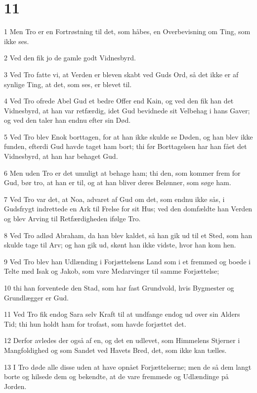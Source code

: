 \chapter{11}

\par 1 Men Tro er en Fortrøstning til det, som håbes, en Overbevisning om Ting, som ikke ses.
\par 2 Ved den fik jo de gamle godt Vidnesbyrd.
\par 3 Ved Tro fatte vi, at Verden er bleven skabt ved Guds Ord, så det ikke er af synlige Ting, at det, som ses, er blevet til.
\par 4 Ved Tro ofrede Abel Gud et bedre Offer end Kain, og ved den fik han det Vidnesbyrd, at han var retfærdig, idet Gud bevidnede sit Velbehag i hans Gaver; og ved den taler han endnu efter sin Død.
\par 5 Ved Tro blev Enok borttagen, for at han ikke skulde se Døden, og han blev ikke funden, efterdi Gud havde taget ham bort; thi før Borttagelsen har han fået det Vidnesbyrd, at han har behaget Gud.
\par 6 Men uden Tro er det umuligt at behage ham; thi den, som kommer frem for Gud, bør tro, at han er til, og at han bliver deres Belønner, som søge ham.
\par 7 Ved Tro var det, at Noa, advaret af Gud om det, som endnu ikke sås, i Gudsfrygt indrettede en Ark til Frelse for sit Hus; ved den domfældte han Verden og blev Arving til Retfærdigheden ifølge Tro.
\par 8 Ved Tro adlød Abraham, da han blev kaldet, så han gik ud til et Sted, som han skulde tage til Arv; og han gik ud, skønt han ikke vidste, hvor han kom hen.
\par 9 Ved Tro blev han Udlænding i Forjættelsens Land som i et fremmed og boede i Telte med Isak og Jakob, som vare Medarvinger til samme Forjættelse;
\par 10 thi han forventede den Stad, som har fast Grundvold, hvis Bygmester og Grundlægger er Gud.
\par 11 Ved Tro fik endog Sara selv Kraft til at undfange endog ud over sin Alders Tid; thi hun holdt ham for trofast, som havde forjættet det.
\par 12 Derfor avledes der også af en, og det en udlevet, som Himmelens Stjerner i Mangfoldighed og som Sandet ved Havets Bred, det, som ikke kan tælles.
\par 13 I Tro døde alle disse uden at have opnået Forjættelserne; men de så dem langt borte og hilsede dem og bekendte, at de vare fremmede og Udlændinge på Jorden.
